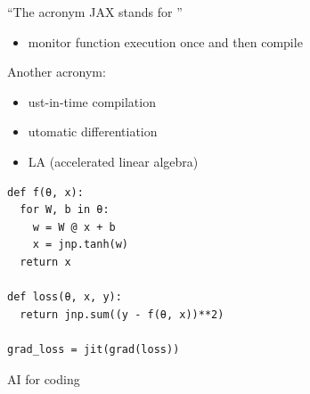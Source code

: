 \begin{frame}

    ``The acronym JAX stands for ''

    \begin{itemize}
        \item monitor function execution once and then compile
    \end{itemize} 

            \vspace{0.5em}
            \vspace{0.5em}
            \vspace{0.5em}

    Another acronym:

    \begin{itemize}
        \item {}ust-in-time compilation
            \vspace{0.5em}
        \item {}utomatic differentiation
            \vspace{0.5em}
        \item {}LA (accelerated linear algebra)
    \end{itemize}



\end{frame}


\begin{frame}[fragile]
    
    \begin{verbatim}
def f(θ, x):
  for W, b in θ:
    w = W @ x + b
    x = jnp.tanh(w)  
  return x

def loss(θ, x, y):
  return jnp.sum((y - f(θ, x))**2)

grad_loss = jit(grad(loss))  
    \end{verbatim}

\end{frame}


\begin{frame}{AI for coding}
    
    \begin{figure}
       \centering
    \end{figure}

\end{frame}

